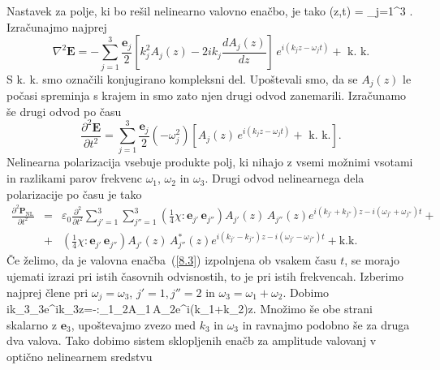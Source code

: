 Nastavek za polje, ki bo rešil nelinearno valovno enačbo, je tako
\beq
{}(z,t) = \sum_{j=1}^3 .
\label{eq:nlnastavek}
\eeq
Izračunajmo najprej 
\begin{equation}
\nabla^{2}\mathbf{E}=-\sum_{j=1}^3 \frac{\mathbf{e}_{j}}{2}\left[k_{j}^{2}A_{j}(z)-2ik_{j}
\frac{dA_{j}(z)}{dz}\right]\, e^{i(k_{j}z-\omega_{j}t)}+\mbox{ k. k.}
\label{8.5}
\end{equation}
S k. k. smo označili konjugirano kompleksni del. Upoštevali smo,
da se $A_{j}(z)$ le počasi spreminja s krajem in smo zato njen
drugi odvod zanemarili.
Izračunamo še drugi odvod po času 
\begin{equation}
\frac{\partial^2\mathbf{E}}{\partial t^2}=\sum_{j=1}^3 \frac{\mathbf{e}_{j}}{2}
\left(-\omega_j^2\right) \left[A_{j}(z)\, e^{i(k_{j}z-\omega_{j}t)}+\mbox{ k. k.}\right].
\label{8.5a}
\end{equation}
Nelinearna polarizacija vsebuje produkte polj, ki nihajo z vsemi možnimi
vsotami in razlikami parov frekvenc $\omega_{1}$, $\omega_{2}$ in
$\omega_{3}$. Drugi odvod nelinearnega dela polarizacije po času je tako
\begin{eqnarray}
\frac{\partial^2\mathbf{P}_\mathrm{NL}}{\partial t^2}&=&\varepsilon_0 \frac{\partial^2}
{\partial t^2}\sum_{j'=1}^3 \sum_{j''=1}^3 
 \left( \frac{1}{4} \chi:\mathbf{e}_{j'}\,\mathbf{e}_{j''}\right) 
 A_{j'}(z)\,A_{j''}(z) e^{i(k_{j'}+k_{j''})z-i(\omega_{j'}+\omega_{j''})t}+ \nonumber\\
&+& \left( \frac{1}{4} \chi:\mathbf{e}_{j'}\,\mathbf{e}_{j''}\right)
A_{j'}(z)\,A_{j''}^*(z) e^{i(k_{j'}-k_{j''})z-i(\omega_{j'}-\omega_{j''})t}+ \mathrm{k. k.}
\label{8.5b}
\end{eqnarray}
Če želimo, da je valovna enačba~(\ref{8.3}) izpolnjena ob vsakem času $t$, se morajo
ujemati izrazi pri istih časovnih odvisnostih, to je pri istih frekvencah. Izberimo
najprej člene pri $\omega_j = \omega_3$, $j'=1, j''=2$ in $\omega_3 = \omega_1 + \omega_2$. Dobimo
\beq
ik_{3}_{3}e^{ik_{3}z}=-\chi:_{1}_{2}A_{1}\,A_{2}e^{i(k_{1}+k_{2})z}.
\label{8.7}
\eeq
Množimo še obe strani skalarno z $\mathbf{e}_{3}$, upoštevajmo zvezo med $k_{3}$ in $\omega_{3}$ in 
ravnajmo podobno še za druga dva valova. Tako dobimo sistem sklopljenih
enačb za amplitude valovanj v optično nelinearnem sredstvu
